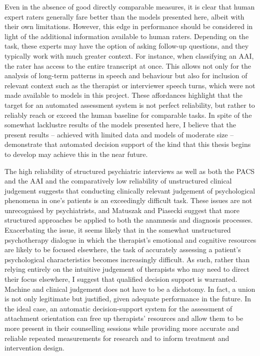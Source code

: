 \documentclass[12pt]{report}
\begin{document}
Even in the absence of good directly comparable measures, it is clear that human expert raters generally fare better than the models presented here, albeit with their own limitations.
However, this edge in performance should be considered in light of the additional information available to human raters.
Depending on the task, these experts may have the option of asking follow-up questions, and they typically work with much greater context.
For instance, when classifying an AAI, the rater has access to the entire transcript at once.
This allows not only for the analysis of long-term patterns in speech and behaviour but also for inclusion of relevant context such as the therapist or interviewer speech turns, which were not made available to models in this project.
These affordances highlight that the target for an automated assessment system is not perfect reliability, but rather to reliably reach or exceed the human baseline for comparable tasks.
In spite of the somewhat lacklustre results of the models presented here, I believe that the present results -- achieved with limited data and models of moderate size -- demonstrate that automated decision support of the kind that this thesis begins to develop may achieve this in the near future.

The high reliability of structured psychiatric interviews as well as both the PACS and the AAI and the comparatively low reliability of unstructured clinical judgement suggests that conducting clinically relevant judgement of psychological phenomena in one's patients is an exceedingly difficult task.
These issues are not unrecognised by psychiatrists, and Matuszak and Piasecki \citeyear{Matuszak2012} suggest that more structured approaches be applied to both the anamnesis and diagnosis processes.
Exacerbating the issue, it seems likely that in the somewhat unstructured psychotherapy dialogue in which the therapist's emotional and cognitive resources are likely to be focused elsewhere, the task of accurately assessing a patient's psychological characteristics becomes increasingly difficult.
As such, rather than relying entirely on the intuitive judgement of therapists who may need to direct their focus elsewhere, I suggest that qualified decision support is warranted.
Machine and clinical judgement does not have to be a dichotomy.
In fact, a union is not only legitimate but justified, given adequate performance in the future.
In the ideal case, an automatic decision-support system for the assessment of attachment orientation can free up therapists' resources and allow them to be more present in their counselling sessions while providing more accurate and reliable repeated measurements for research and to inform treatment and intervention design.
\end{document}
